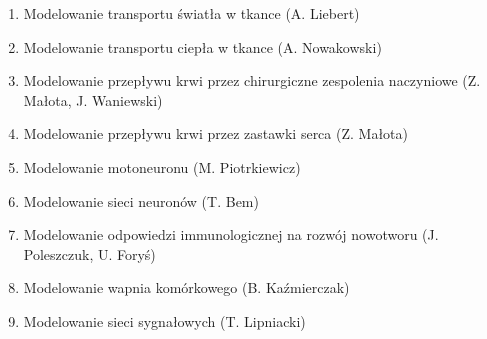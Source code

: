 \documentclass[10pt,a4paper]{article}
\begin{document}
\begin{enumerate}[I.]
\begin{enumerate}[1.]
			\item Modelowanie transportu światła w tkance (A. Liebert)
			\item Modelowanie transportu ciepła w tkance (A. Nowakowski)
			\item Modelowanie przepływu krwi przez chirurgiczne zespolenia naczyniowe (Z. Małota, J. Waniewski)
			\item Modelowanie przepływu krwi przez zastawki serca (Z. Małota)
			\item Modelowanie motoneuronu (M. Piotrkiewicz)
			\item Modelowanie sieci neuronów (T. Bem)
			\item Modelowanie odpowiedzi immunologicznej na rozwój nowotworu (J. Poleszczuk, U. Foryś)
			\item Modelowanie wapnia komórkowego (B. Kaźmierczak)
			\item Modelowanie sieci sygnałowych (T. Lipniacki)
		\end{enumerate}
	\end{enumerate}
\end{document}
